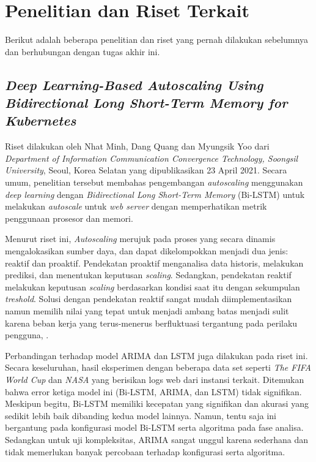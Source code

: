 \section{Penelitian dan Riset Terkait}
Berikut adalah beberapa penelitian dan riset yang pernah dilakukan sebelumnya dan berhubungan dengan tugas akhir ini.

\subsection{\textit{Deep Learning-Based Autoscaling Using Bidirectional Long Short-Term Memory for Kubernetes}}
Riset dilakukan oleh Nhat Minh, Dang Quang dan Myungsik Yoo dari \textit{Department of Information Communication Convergence Technology, Soongsil University}, Seoul, Korea Selatan yang dipublikasikan 23 April 2021. Secara umum, penelitian tersebut membahas pengembangan \textit{autoscaling} menggunakan \textit{deep learning} dengan \textit{Bidirectional Long Short-Term Memory} (Bi-LSTM) untuk melakukan \textit{autoscale} untuk \textit{web server} dengan memperhatikan metrik penggunaan prosesor dan memori.

Menurut riset ini, \textit{Autoscaling} merujuk pada proses yang secara dinamis mengalokasikan sumber daya, dan dapat dikelompokkan menjadi dua jenis: reaktif dan proaktif. Pendekatan proaktif menganalisa data historis, melakukan prediksi, dan menentukan keputusan \textit{scaling}. Sedangkan, pendekatan reaktif melakukan keputusan \textit{scaling} berdasarkan kondisi saat itu dengan sekumpulan \textit{treshold}. Solusi dengan pendekatan reaktif sangat mudah diimplementasikan namun memilih nilai yang tepat untuk menjadi ambang batas menjadi sulit karena beban kerja yang terus-menerus berfluktuasi tergantung pada perilaku pengguna, \parencite{riset1}.

Perbandingan terhadap model ARIMA dan LSTM juga dilakukan pada riset ini. Secara keseluruhan, hasil eksperimen dengan beberapa data set seperti \textit{The FIFA World Cup} dan \textit{NASA} yang berisikan logs web dari instansi terkait. Ditemukan bahwa error ketiga model ini (Bi-LSTM, ARIMA, dan LSTM) tidak signifikan. Meskipun begitu, Bi-LSTM memiliki kecepatan yang signifikan dan akurasi yang sedikit lebih baik dibanding kedua model lainnya. Namun, tentu saja ini bergantung pada konfigurasi model Bi-LSTM serta algoritma pada fase analisa. Sedangkan untuk uji kompleksitas, ARIMA sangat unggul karena sederhana dan tidak memerlukan banyak percobaan terhadap konfigurasi serta algoritma.

